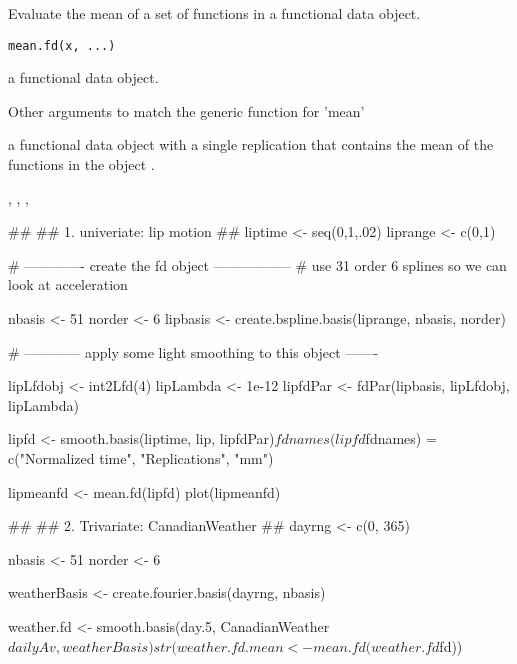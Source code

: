 \documentclass{article}
\begin{document}
\begin{Description}\relax
Evaluate the mean of a set of functions in a functional data object.
\end{Description}
\begin{Usage}
\begin{verbatim}
mean.fd(x, ...)
\end{verbatim}
\end{Usage}
\begin{Arguments}
\begin{ldescription}
\item[\code{x}] a functional data object.

\item[\code{...}] Other arguments to match the generic function for 'mean'
\end{ldescription}
\end{Arguments}
\begin{Value}
a functional data object with a single replication
that contains the mean of the functions in the object .
\end{Value}
\begin{SeeAlso}\relax
{}, 
, 
, 
\end{SeeAlso}
\begin{Examples}
\begin{ExampleCode}
##
## 1.  univeriate:  lip motion
##
liptime  <- seq(0,1,.02)
liprange <- c(0,1)

#  -------------  create the fd object -----------------
#       use 31 order 6 splines so we can look at acceleration

nbasis <- 51
norder <- 6
lipbasis <- create.bspline.basis(liprange, nbasis, norder)

#  ------------  apply some light smoothing to this object  -------

lipLfdobj   <- int2Lfd(4)
lipLambda   <- 1e-12
lipfdPar <- fdPar(lipbasis, lipLfdobj, lipLambda)

lipfd <- smooth.basis(liptime, lip, lipfdPar)$fd
names(lipfd$fdnames) = c("Normalized time", "Replications", "mm")

lipmeanfd <- mean.fd(lipfd)
plot(lipmeanfd)

##
## 2.  Trivariate:  CanadianWeather
##
dayrng <- c(0, 365) 

nbasis <- 51
norder <- 6 

weatherBasis <- create.fourier.basis(dayrng, nbasis)

weather.fd <- smooth.basis(day.5, CanadianWeather$dailyAv,
            weatherBasis)

str(weather.fd.mean <- mean.fd(weather.fd$fd))

\end{ExampleCode}
\end{Examples}
\end{document}
